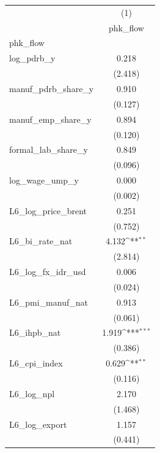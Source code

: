 {
\def\sym#1{\ifmmode^{#1}\else\(^{#1}\)\fi}
\begin{tabular}{l*{1}{c}}
\toprule
                &\multicolumn{1}{c}{(1)}\\
                &\multicolumn{1}{c}{phk\_flow}\\
\midrule
phk\_flow        &                  \\
log\_pdrb\_y      &    0.218         \\
                &  (2.418)         \\
\addlinespace
manuf\_pdrb\_share\_y&    0.910         \\
                &  (0.127)         \\
\addlinespace
manuf\_emp\_share\_y&    0.894         \\
                &  (0.120)         \\
\addlinespace
formal\_lab\_share\_y&    0.849         \\
                &  (0.096)         \\
\addlinespace
log\_wage\_ump\_y  &    0.000         \\
                &  (0.002)         \\
\addlinespace
L6\_log\_price\_brent&    0.251         \\
                &  (0.752)         \\
\addlinespace
L6\_bi\_rate\_nat  &    4.132\sym{**} \\
                &  (2.814)         \\
\addlinespace
L6\_log\_fx\_idr\_usd&    0.006         \\
                &  (0.024)         \\
\addlinespace
L6\_pmi\_manuf\_nat&    0.913         \\
                &  (0.061)         \\
\addlinespace
L6\_ihpb\_nat     &    1.919\sym{***}\\
                &  (0.386)         \\
\addlinespace
L6\_cpi\_index    &    0.629\sym{**} \\
                &  (0.116)         \\
\addlinespace
L6\_log\_npl      &    2.170         \\
                &  (1.468)         \\
\addlinespace
L6\_log\_export   &    1.157         \\
                &  (0.441)         \\

\end{tabular}}
